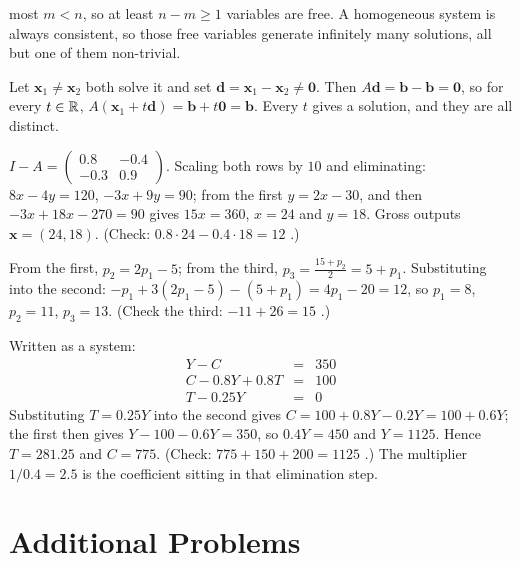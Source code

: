 \begin{solutions}
        most $m<n$, so at least $n-m\ge1$ variables are free. A homogeneous
        system is always consistent, so those free variables generate
        infinitely many solutions, all but one of them non-trivial.
  \item Let $\mathbf{x}_{1}\neq\mathbf{x}_{2}$ both solve it and set
        $\mathbf{d}=\mathbf{x}_{1}-\mathbf{x}_{2}\neq\mathbf{0}$. Then
        $A\mathbf{d}=\mathbf{b}-\mathbf{b}=\mathbf{0}$, so for every
        $t\in\mathbb{R}$,
        $A(\mathbf{x}_{1}+t\mathbf{d})=\mathbf{b}+t\mathbf{0}=\mathbf{b}$.
        Every $t$ gives a solution, and they are all distinct.
  \item $I-A=\begin{pmatrix}0.8&-0.4\\-0.3&0.9\end{pmatrix}$. Scaling both
        rows by $10$ and eliminating:
        $8x-4y=120$, $-3x+9y=90$; from the first $y=2x-30$, and then
        $-3x+18x-270=90$ gives $15x=360$, $x=24$ and $y=18$. Gross outputs
        $\mathbf{x}=(24,18)$. (Check: $0.8\cdot24-0.4\cdot18=12$
        \checkmark.)
  \item From the first, $p_{2}=2p_{1}-5$; from the third,
        $p_{3}=\tfrac{15+p_{2}}{2}=5+p_{1}$. Substituting into the second:
        $-p_{1}+3(2p_{1}-5)-(5+p_{1})=4p_{1}-20=12$, so $p_{1}=8$,
        $p_{2}=11$, $p_{3}=13$. (Check the third: $-11+26=15$
        \checkmark.)
  \item Written as a system:
        \[
          \begin{array}{rcl}
            Y-C&=&350\\
            C-0.8Y+0.8T&=&100\\
            T-0.25Y&=&0
          \end{array}
        \]
        Substituting $T=0.25Y$ into the second gives
        $C=100+0.8Y-0.2Y=100+0.6Y$; the first then gives
        $Y-100-0.6Y=350$, so $0.4Y=450$ and $Y=1125$. Hence
        $T=281.25$ and $C=775$. (Check: $775+150+200=1125$ \checkmark.)
        The multiplier $1/0.4=2.5$ is the coefficient sitting in that
        elimination step.
\end{solutions}

\section{Additional Problems}

